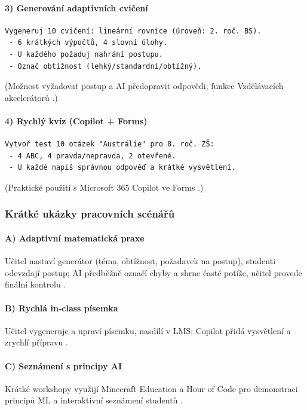 \documentclass{report}%
\begin{document}
\paragraph{3) Generování adaptivních cvičení}
\begin{verbatim}
Vygeneruj 10 cvičení: lineární rovnice (úroveň: 2. roč. BS).
 - 6 krátkých výpočtů, 4 slovní úlohy.
 - U každého požaduj nahrání postupu.
 - Označ obtížnost (lehký/standardní/obtížný).
\end{verbatim}
(Možnost vyžadovat postup a AI předopravit odpovědi; funkce Vzdělávacích akcelerátorů \cite{kb_ai_101_tipu_pdf_04e4a115_page_8_1}.)

\paragraph{4) Rychlý kvíz (Copilot + Forms)}
\begin{verbatim}
Vytvoř test 10 otázek "Austrálie" pro 8. roč. ZŠ:
 - 4 ABC, 4 pravda/nepravda, 2 otevřené.
 - U každé napiš správnou odpověď a krátké vysvětlení.
\end{verbatim}
(Praktické použití s Microsoft 365 Copilot ve Forms \cite{kb_ai_101_tipu_pdf_04e4a115_page_36_1}.)

\subsubsection*{Krátké ukázky pracovních scénářů}
\paragraph{A) Adaptivní matematická praxe}
Učitel nastaví generátor (téma, obtížnost, požadavek na postup), studenti odevzdají postup; AI předběžně označí chyby a shrne časté potíže, učitel provede finální kontrolu \cite{kb_ai_101_tipu_pdf_04e4a115_page_8_1}.

\paragraph{B) Rychlá in‑class písemka}
Učitel vygeneruje a upraví písemku, nasdílí v LMS; Copilot přidá vysvětlení a zrychlí přípravu \cite{kb_ai_101_tipu_pdf_04e4a115_page_36_1}.

\paragraph{C) Seznámení s principy AI}
Krátké workshopy využijí Minecraft Education a Hour of Code pro demonstraci principů ML a interaktivní seznámení studentů \cite{kb_ai_101_tipu_pdf_04e4a115_page_15_2}.
\end{document}
